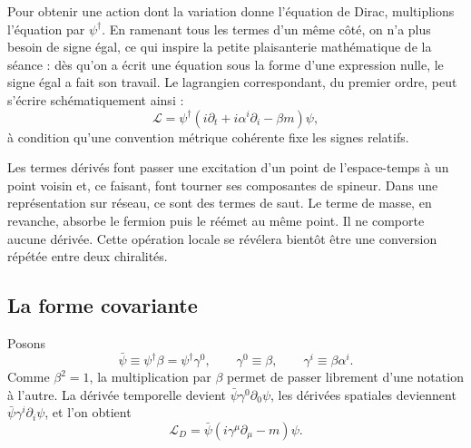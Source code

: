 Pour obtenir une action dont la variation donne l’équation de Dirac, multiplions l’équation par \(\psi^\dagger\). En ramenant tous les termes d’un même côté, on n’a plus besoin de signe égal, ce qui inspire la petite plaisanterie mathématique de la séance : dès qu’on a écrit une équation sous la forme d’une expression nulle, le signe égal a fait son travail. Le lagrangien correspondant, du premier ordre, peut s’écrire schématiquement ainsi : \begin{equation}
  \mathcal L
  =
  \psi^\dagger
  \left(i\partial_t+i\alpha^i\partial_i-\beta m\right)\psi ,
  \label{eq:l10-dirac-old-lagrangian}
\end{equation}à condition qu’une convention métrique cohérente fixe les signes relatifs.

Les termes dérivés font passer une excitation d’un point de l’espace-temps à un point voisin et, ce faisant, font tourner ses composantes de spineur. Dans une représentation sur réseau, ce sont des termes de saut. Le terme de masse, en revanche, absorbe le fermion puis le réémet au même point. Il ne comporte aucune dérivée. Cette opération locale se révélera bientôt être une conversion répétée entre deux chiralités.

\begin{classroomqa}\end{classroomqa}

\subsection{La forme covariante}

Posons \begin{equation}
  \bar\psi\equiv\psi^\dagger\beta
  =\psi^\dagger\gamma^0,
  \qquad
  \gamma^0\equiv\beta,
  \qquad
  \gamma^i\equiv\beta\alpha^i .
  \label{eq:l10-dirac-adjoint}
\end{equation}Comme \(\beta^2=1\), la multiplication par \(\beta\) permet de passer librement d’une notation à l’autre. La dérivée temporelle devient \(\bar\psi\gamma^0\partial_0\psi\), les dérivées spatiales deviennent \(\bar\psi\gamma^i\partial_i\psi\), et l’on obtient \begin{equation}
  \boxed{\mathcal L_D
  =\bar\psi\left(i\gamma^\mu\partial_\mu-m\right)\psi .}
  \label{eq:l10-covariant-dirac}
\end{equation}

